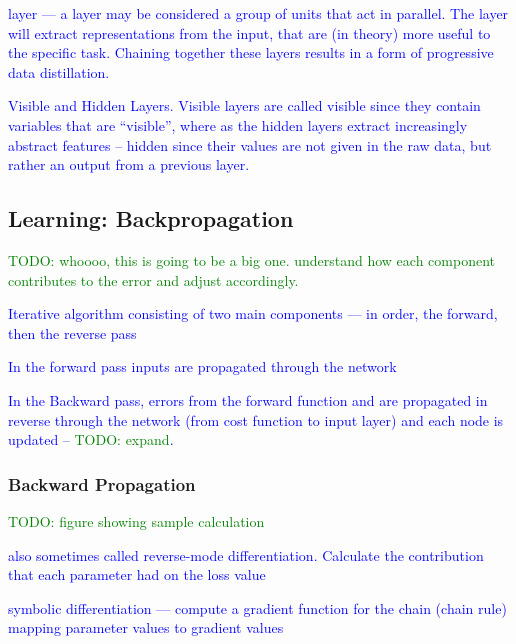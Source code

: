 \textcolor{blue}{layer --- a layer may be considered a group of units that act in parallel. The layer will extract representations from the input, that are (in theory) more useful to the specific task.  Chaining together these layers results in a form of progressive {data distillation}.}

\textcolor{blue}{Visible and Hidden Layers. Visible layers are called visible since they contain variables that are ``visible'', where as the hidden layers extract increasingly abstract features -- hidden since their values are not given in the raw data, but rather an output from a previous layer.}



\subsection{Learning: Backpropagation}

\textcolor{green}{TODO: whoooo, this is going to be a big one. understand how each component contributes to the error and adjust accordingly.}

\textcolor{blue}{Iterative algorithm consisting of two main components --- in order, the forward, then the reverse pass}

\textcolor{blue}{In the forward pass inputs are propagated through the network}

\textcolor{blue}{In the Backward pass, errors from the forward function and  are propagated in reverse through the network (from cost function to input layer) and each node is updated -- \textcolor{green}{TODO: expand}.}

\subsubsection{Backward Propagation}


\textcolor{green}{TODO: figure showing sample calculation}



\textcolor{blue}{also sometimes called {reverse-mode differentiation}.  Calculate the contribution that each parameter had on the loss value}

\textcolor{blue}{{symbolic differentiation} --- compute a gradient function for the chain (chain rule) mapping parameter values to gradient values}

